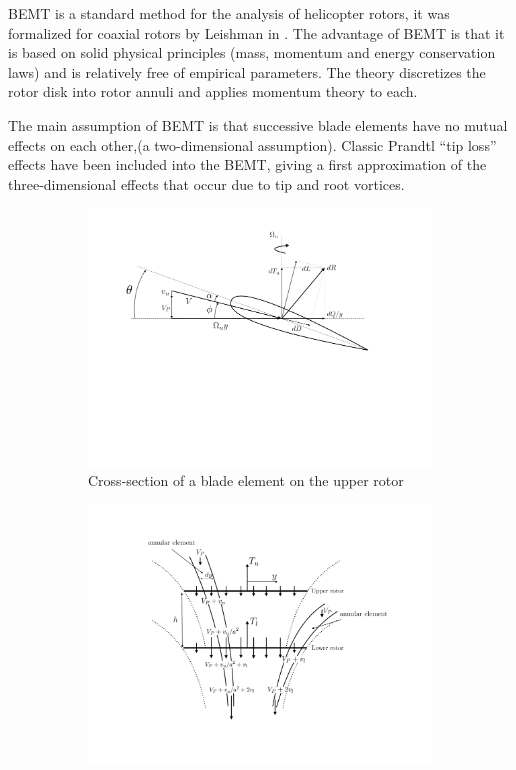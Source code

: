 BEMT is a standard method for the analysis of helicopter rotors, it was formalized for coaxial rotors by Leishman in \cite{BEMT}. The advantage of BEMT is that it is based on solid physical principles (mass, momentum and energy conservation laws) and is relatively free of empirical parameters. The theory discretizes the rotor disk into rotor annuli and applies momentum theory to each.

The main assumption of BEMT is that successive blade elements have no mutual effects on each other,(a two-dimensional assumption). Classic Prandtl “tip loss” effects have been included into the BEMT, giving a first approximation of the three-dimensional effects that occur due to tip and root vortices.


\begin{figure}[]
\captionsetup[subfigure]{justification=centering}
\begin{subfigure}[t]{0.5\textwidth}
    \centering
    \includegraphics[width=\textwidth]{Figures/blade_axial.pdf}
    \caption{Cross-section of a blade element on the upper rotor}
    \label{fig:blade2d}
\end{subfigure}
\begin{subfigure}[t]{0.5\textwidth}
    \centering
    \includegraphics[width=\textwidth]{Figures/disk2D_BEM_axial.pdf}

\end{subfigure}
\end{figure}
